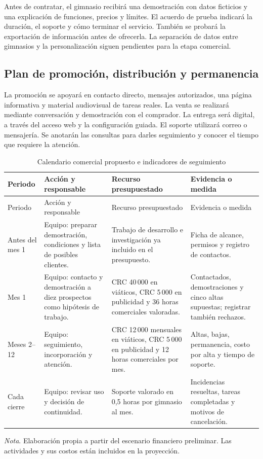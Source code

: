 Antes de contratar, el gimnasio recibirá una demostración con datos ficticios y
una explicación de funciones, precios y límites. El acuerdo de prueba indicará
la duración, el soporte y cómo terminar el servicio. También se probará la
exportación de información antes de ofrecerla. La separación de datos entre
gimnasios y la personalización siguen pendientes para la etapa comercial.

\subsection{Plan de promoción, distribución y permanencia}

La promoción se apoyará en contacto directo, mensajes autorizados, una página
informativa y material audiovisual de tareas reales. La venta se realizará
mediante conversación y demostración con el comprador. La entrega será digital,
a través del acceso web y la configuración guiada. El soporte utilizará correo
o mensajería. Se anotarán las consultas para darles seguimiento y conocer el
tiempo que requiere la atención.

\begin{longtable}{p{2.1cm}p{4.0cm}p{4.0cm}p{3.8cm}}
\caption{Calendario comercial propuesto e indicadores de seguimiento}\\
\toprule
Periodo & Acción y responsable & Recurso presupuestado & Evidencia o medida \\
\midrule\endfirsthead
\toprule Periodo & Acción y responsable & Recurso presupuestado & Evidencia o medida \\
\midrule\endhead
Antes del mes 1 & Equipo: preparar demostración, condiciones y lista de posibles clientes. & Trabajo de desarrollo e investigación ya incluido en el presupuesto. & Ficha de alcance, permisos y registro de contactos. \\
Mes 1 & Equipo: contacto y demostración a diez prospectos como hipótesis de trabajo. & CRC 40\,000 en viáticos, CRC 5\,000 en publicidad y 36 horas comerciales valoradas. & Contactados, demostraciones y cinco altas supuestas; registrar también rechazos. \\
Meses 2--12 & Equipo: seguimiento, incorporación y atención. & CRC 12\,000 mensuales en viáticos, CRC 5\,000 en publicidad y 12 horas comerciales por mes. & Altas, bajas, permanencia, costo por alta y tiempo de soporte. \\
Cada cierre & Equipo: revisar uso y decisión de continuidad. & Soporte valorado en 0,5 horas por gimnasio al mes. & Incidencias resueltas, tareas completadas y motivos de cancelación. \\
\bottomrule
\end{longtable}
{\small\textit{Nota}. Elaboración propia a partir del escenario financiero
preliminar. Las actividades y sus costos están incluidos en la proyección.}


